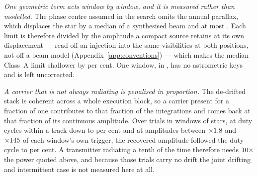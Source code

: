 \emph{One geometric term acts window by window, and it is measured rather
than modelled.} The phase centre assumed in the search omits the annual
parallax, which displaces the star by a median \SensBeamsMed{} of a
synthesised beam and at most \SensBeamsMax. Each limit is therefore divided
by the amplitude a compact source retains at its own displacement --- read
off an injection into the same visibilities at both positions, not off a beam
model (Appendix~\ref{app:conventions}) --- which makes the median Class~A
limit shallower by \PxaShiftWinPct{} per cent. One window,
\PxaMissingStar{} in \PxaMissingEb, has no astrometric keys and is left
uncorrected.

\emph{A carrier that is not always radiating is penalised in proportion.} The
de-drifted stack is coherent across a whole execution block, so a carrier
present for a fraction of one contributes to that fraction of the
integrations and comes back at that fraction of its continuous amplitude.
Over \DutyNTrial{} trials in \DutyNWin{} windows of \DutyNStar{} stars, at
\DutyNCycle{} duty cycles within a track down to \DutyCycleMinPct{} per cent
and at amplitudes between $\times1.8$ and $\times145$
of each window's own trigger, the recovered amplitude followed the duty cycle
to \DutyAttenDevPct{} per cent. A transmitter radiating a tenth of the time
therefore needs $10\times$ the power quoted above, and because those
trials carry no drift the joint drifting and intermittent case is not
measured here at all.

\begin{table}
\centering
\scriptsize
\caption{What sets $\mathrm{EIRP}_{90}$, and in which direction. The
uncertainty on the calibration is an uncertainty on the class-average factor,
and so on any statistic formed over many windows; the spread between windows
is an observed dispersion and is the statement about one window's own limit;
the signed terms are biases, stated with their direction rather than folded
into an error bar. The decorrelation bias is measured in \SensDecorNBlk{} of
the \SensDecorNBlkTot{} execution blocks, those whose delivery includes the
observatory's own record of the phase stability, and is not imputed to the
rest.}
\label{tab:p90budget}
\tiny
\setlength{\tabcolsep}{2pt}

\end{table}

